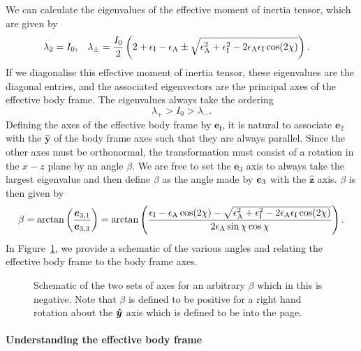\documentclass[../full_thesis/full_thesis.tex]{subfiles}
\newcommand{\thisdir}{../rotating_frame}
\begin{document}
We can calculate the eigenvalues of the effective moment of inertia tensor, which are given by
\begin{align}
\lambda_{2}=I_{0}, &&&
\lambda_{\pm}=\frac{I_{0}}{2}
\left(2+\epsilon_{\mathrm{I}}-\epsilon_{\mathrm{A}}\pm
\sqrt{\epsilon_{\mathrm{A}}^{2}+\epsilon_{\mathrm{I}}^{2}-2\epsilon_{\mathrm{A}}\epsilon_{\mathrm{I}}\cos(2\chi)}\right).
\end{align}
If we diagonalise this effective moment of inertia tensor, these eigenvalues
are the diagonal entries, and the associated eigenvectors are the principal
axes of the effective body frame. The eigenvalues always take the ordering
\begin{equation}
\lambda_{+}>I_{0}>\lambda_{-}.
\end{equation}
Defining the axes of the effective body frame by $\boldsymbol{e_{i}}$, it is natural to
associate $\boldsymbol{e}_{2}$ with the
$\boldsymbol{\hat{y}}$ of the body frame axes such that they are always
parallel. Since the other axes must be orthonormal, the transformation must
consist of a rotation in the $x-z$ plane by an angle $\beta$. We are
free to set the $\boldsymbol{e}_{3}$ axis to always take the largest eigenvalue
and then define $\beta$ as the angle made by $\boldsymbol{e}_{3}$ with the
$\hat{\boldsymbol{z}}$ axis. $\beta$ is then given by
\begin{equation}
\beta = \arctan\left(\frac{\boldsymbol{e}_{3,1}}{\boldsymbol{e}_{3,3}}\right)
=\arctan\left( \frac{ \epsilon_{\mathrm{I}}-\epsilon_{\mathrm{A}}\cos(2\chi)-
              \sqrt{\epsilon_{\mathrm{A}}^{2}+\epsilon_{\mathrm{I}}^{2}-2\epsilon_{\mathrm{A}}\epsilon_{\mathrm{I}}\cos(2\chi)}}
              {2\epsilon_{\mathrm{A}}\sin\chi \cos\chi}\right).
\label{eqn: beta}
\end{equation}
In Figure~\ref{fig: schematic}, we provide a schematic of the various angles
and relating the effective body frame to the body frame axes.
\begin{figure}[ht]
\centering
 
\caption{Schematic of the two sets of axes for an arbitrary $\beta$ which in this
is negative. Note that
$\beta$ is defined to be positive for a right hand rotation about the $\boldsymbol{\hat{y}}$ axis
which is defined to be into the page.}
\label{fig: schematic}
\end{figure}

\paragraph{Understanding the effective body frame}
\end{document}
